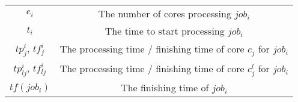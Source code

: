 \documentclass{llncs}
\begin{document}
\begin{appendices}
\begin{table}[htbp]
\begin{center}
\begin{tabular}{c|c}
$e_i$ & The number of cores processing $job_i$\\
$t_i$ & The time to start processing $job_i$\\
$tp^i_j$, $tf^i_{j}$ & The processing time / finishing time of core $c_j$ for $job_i$\\
$tp^i_{lj}$, $tf^i_{lj}$ & The processing time / finishing time of core $c^l_j$ for $job_i$\\
$tf(job_i)$ & The finishing time of $job_i$ \\

\bottomrule
\end{tabular}
\label{tabSYMBOLS}
\end{center}
\end{table}

\end{appendices}





\end{document}
